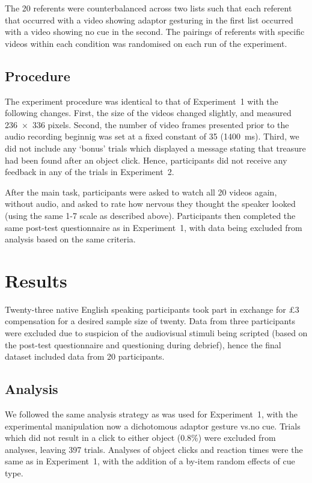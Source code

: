 \documentclass[a4paper,man,natbib]{apa6}
\begin{document}
The 20 referents were counterbalanced across two lists such that each referent that occurred with a video showing adaptor gesturing in the first list occurred with a video showing no cue in the second.
The pairings of referents with specific videos within each condition was randomised on each run of the experiment.

\subsection{Procedure}
The experiment procedure was identical to that of Experiment~1 with the following changes.
First, the size of the videos changed slightly, and measured 236~$\times$~336 pixels.
Second, the number of video frames presented prior to the audio recording beginnig was set at a fixed constant of 35 (1400~ms).
Third, we did not include any `bonus' trials which displayed a message stating that treasure had been found after an object click.
Hence, participants did not receive any feedback in any of the trials in Experiment~2.

After the main task, participants were asked to watch all 20 videos again, without audio, and asked to rate how nervous they thought the speaker looked (using the same 1-7 scale as described above).
Participants then completed the same post-test questionnaire as in Experiment~1, with data being excluded from analysis based on the same criteria.

\section{Results}
Twenty-three native English speaking participants took part in exchange for \pounds{}3 compensation for a desired sample size of twenty. 
Data from three participants were excluded due to suspicion of the audiovisual stimuli being scripted (based on the post-test questionnaire and questioning during debrief), hence the final dataset included data from 20 participants.

\subsection{Analysis}
We followed the same analysis strategy as was used for Experiment~1, with the experimental manipulation now a dichotomous adaptor gesture vs.\@ no cue.
Trials which did not result in a click to either object (0.8\%) were excluded from analyses, leaving 397 trials.
Analyses of object clicks and reaction times were the same as in Experiment~1, with the addition of a by-item random effects of cue type.
\end{document}
